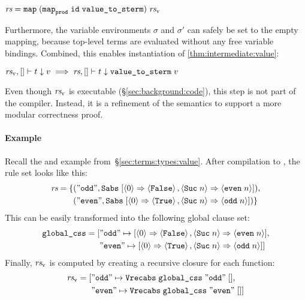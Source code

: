 \begin{corollary}\label{thm:intermediate:value:sublocale}
  $\textit{rs} = \texttt{\textup{map}}\;(\texttt{\textup{map}}_{\texttt{\textup{prod}}}\;\texttt{\textup{id}}\;\texttt{\textup{value\_to\_sterm}})\;\textit{rs}_\text{v}$
\end{corollary}

\noindent
Furthermore, the variable environments $\sigma$ and $\sigma'$ can safely be set to the empty mapping, because top-level terms are evaluated without any free variable bindings.
Combined, this enables instantiation of \cref{thm:intermediate:value}:

\begin{corollary}[Correctness]
  $\textit{rs}_\text{v}, [] \vdash t \downarrow v \implies \textit{rs}, [] \vdash t \downarrow \texttt{\textup{value\_to\_sterm}}\;v$
\end{corollary}

\noindent
Even though $\textit{rs}_\text{v}$ is executable (§\ref{sec:background:code}), this step is not part of the compiler.
Instead, it is a refinement of the semantics to support a more modular correctness proof.

\paragraph{Example}

Recall the  and  example from~§\ref{sec:terms:types:value}.
After compilation to , the rule set looks like this:
\[
  \begin{aligned}
    \textit{rs} = \{ &(\mathtt{"odd"},  \texttt{\textup{Sabs}}\; [\left\langle0\right\rangle \Rightarrow \left\langle\texttt{\textup{False}}\right\rangle, \left\langle\texttt{\textup{Suc}}\;n\right\rangle \Rightarrow \left\langle\texttt{\textup{even}}\;n\right\rangle]), \\
             &(\mathtt{"even"}, \texttt{\textup{Sabs}}\; [\left\langle0\right\rangle \Rightarrow \left\langle\texttt{\textup{True}}\right\rangle, \left\langle\texttt{\textup{Suc}}\;n\right\rangle \Rightarrow \left\langle\texttt{\textup{odd}}\;n\right\rangle])
    \}
  \end{aligned}
\]
This can be easily transformed into the following global clause set:
\begin{align*}
  \texttt{\textup{global\_css}} = [&\mathtt{"odd"} \mapsto [ \left\langle0\right\rangle \Rightarrow \left\langle\texttt{\textup{False}}\right\rangle, \left\langle\texttt{\textup{Suc}}\;n\right\rangle \Rightarrow \left\langle\texttt{\textup{even}}\;n\right\rangle], \\
                            &\mathtt{"even"} \mapsto [ \left\langle0\right\rangle \Rightarrow \left\langle\texttt{\textup{True}}\right\rangle, \left\langle\texttt{\textup{Suc}}\;n\right\rangle \Rightarrow \left\langle\texttt{\textup{odd}}\;n\right\rangle]]
\end{align*}
Finally, $\textit{rs}_\text{v}$ is computed by creating a recursive closure for each function:
\begin{align*}
  \textit{rs}_\text{v} =
    [&\mathtt{"odd"} \mapsto \texttt{\textup{Vrecabs}}\;\texttt{\textup{global\_css}}\;\mathtt{"odd"}\;[], \\
     &\mathtt{"even"} \mapsto \texttt{\textup{Vrecabs}}\;\texttt{\textup{global\_css}}\;\mathtt{"even"}\;[]]
\end{align*}